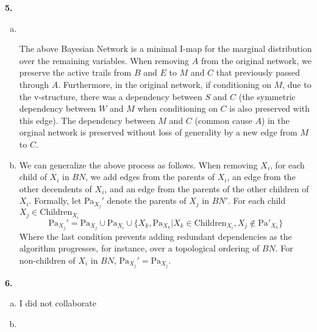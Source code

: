 \documentclass{article}
\begin{document}
\textbf{5.} \begin{enumerate}[(a)]
    \item \textcolor{white}{{s}}\begin{center}
    \end{center}
    The above Bayesian Network is a minimal I-map for the marginal distribution over the remaining variables. When removing $A$ from the original network, we preserve the active trails from $B$ and $E$ to $M$ and $C$ that previously passed through $A$. Furthermore, in the original network, if conditioning on $M$, due to the v-structure, there was a dependency between $S$ and $C$ (the symmetric dependency between $W$ and $M$ when conditioning on $C$ is also preserved with this edge). The dependency between $M$ and $C$ (common cause $A$) in the orginal network is preserved without loss of generality by a new edge from $M$ to $C$. 
    \item We can generalize the above process as follows. When removing $X_i$, for each child of $X_i$ in $BN$, we add edges from the parents of $X_i$, an edge from the other decendents of $X_i$, and an edge from the parents of the other children of $X_i$. Formally, let Pa$_{X_j}'$ denote the parents of $X_j$ in $BN'$. For each child $X_j \in \text{Children}_{X_i}$ \begin{equation*}
        \text{Pa}_{X_j}' = \text{Pa}_{X_j} \cup \text{Pa}_{X_i} \cup \{X_k, \text{Pa}_{X_k} | X_k \in \text{Children}_{X_i}, X_j \notin \text{Pa}'_{X_k}\}
    \end{equation*}
    Where the last condition prevents adding redundant dependencies as the algorithm progresses, for instance, over a topological ordering of $BN$. For non-children of $X_i$ in $BN$, $\text{Pa}_{X_j}' = \text{Pa}_{X_j}$. 
\end{enumerate}
\textbf{6.} \begin{enumerate}[(a)]
    \item I did not collaborate 
    \item 
\end{enumerate}
\end{document}
